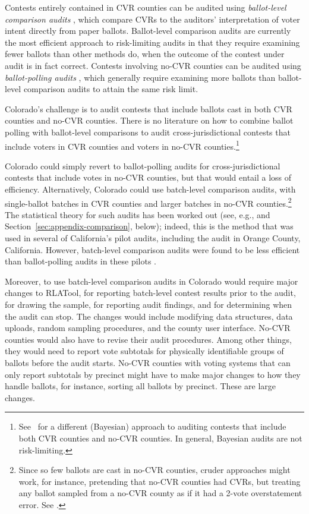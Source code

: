 \documentclass[runningheads]{llncs}
\begin{document}
Contests entirely contained in CVR counties can be audited using \emph{ballot-level comparison audits} \cite{lindemanStark12}, which compare CVRs to the auditors' interpretation of voter intent directly from paper ballots.
Ballot-level comparison audits are currently the most efficient approach to risk-limiting audits in that they require examining fewer ballots than other methods do, when the outcome of the contest under audit is in fact correct.
Contests involving no-CVR counties can be audited using \emph{ballot-polling audits} \cite{lindemanEtal12,lindemanStark12},  which generally require examining more ballots than ballot-level comparison audits to attain the same risk limit.

Colorado's challenge is to audit contests that include ballots cast in both CVR counties and no-CVR counties. There is no literature on how to combine ballot polling with ballot-level comparisons to audit 
cross-jurisdictional contests 
that include voters in CVR counties and voters in no-CVR counties.\footnote{%
  See~\cite{Rivest-2018-bayesian-tabulation-audits}
  for a different (Bayesian) approach to auditing contests that include both CVR counties
  and no-CVR counties. In general, Bayesian audits are not risk-limiting.
}

Colorado could simply revert to ballot-polling audits for cross-jurisdictional contests that include votes in no-CVR counties, but that would entail a loss of efficiency.
Alternatively, Colorado could use batch-level comparison audits, with single-ballot batches in CVR counties and larger batches in no-CVR counties.\footnote{%
Since so few ballots are cast in no-CVR counties, cruder approaches might work, for instance, pretending that no-CVR counties had CVRs, but treating any ballot sampled from a no-CVR county as if it had a 2-vote overstatement error. See \cite{banuelosStark12}.
}
The statistical theory for such audits has been worked out (see, e.g., \cite{stark08a,stark09c,stark09b,stark10d} and Section~\ref{sec:appendix-comparison}, below); indeed, this is the method that was used in several of California's pilot audits, including the audit in Orange County, California.
However, batch-level comparison audits were found to be less efficient than ballot-polling audits in these pilots \cite{CA_SOS_EAC}.

Moreover, to use batch-level comparison audits in Colorado would require major changes to RLATool, for reporting batch-level contest results prior to the audit, for drawing the sample, for reporting audit findings, and for determining when the audit can stop. 
The changes would include modifying data structures, data uploads, random sampling procedures, and the county user interface.
No-CVR counties would also have to revise their audit procedures.
Among other things, they would need to report vote subtotals
for physically identifiable groups of ballots before the audit starts.
No-CVR counties with voting systems that can only report subtotals by precinct
might have to make major changes to how they handle ballots, for instance, sorting all ballots by precinct.
These are large changes.
\end{document}
